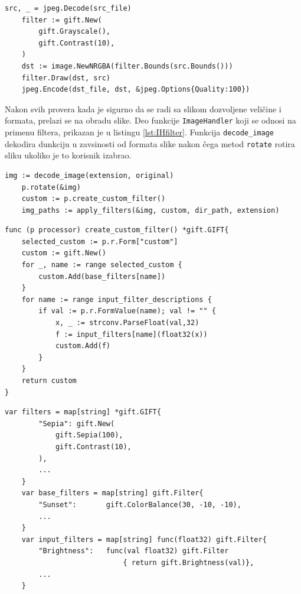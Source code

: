 \documentclass[12pt,oneside]{memoir}
\begin{document}
\begin{center}
\begin{lstlisting}[caption=Definisanje i primena filtera,label={lst:gift},  backgroundcolor=\color{background}]
	src, _ = jpeg.Decode(src_file)
	filter := gift.New(
		gift.Grayscale(),
		gift.Contrast(10),
	)
	dst := image.NewNRGBA(filter.Bounds(src.Bounds()))
	filter.Draw(dst, src)
	jpeg.Encode(dst_file, dst, &jpeg.Options{Quality:100})
\end{lstlisting}
\end{center}

Nakon svih provera kada je sigurno da se radi sa slikom dozvoljene veličine i formata, prelazi se na obradu slike. Deo funkcije  \texttt{ImageHandler} koji se odnosi na primenu filtera, prikazan je u listingu \ref{lst:IHfilter}. Funkcija  \texttt{decode\_image} dekodira dunkciju u zavsinosti od formata slike nakon čega metod  \texttt{rotate} rotira sliku ukoliko je to korisnik izabrao. 

\begin{center}
\begin{lstlisting}[caption=Primena filtera u funkciji ImageHandler,label={lst:IHfilter},  backgroundcolor=\color{background}]
	img := decode_image(extension, original)
	p.rotate(&img)
	custom := p.create_custom_filter()
	img_paths := apply_filters(&img, custom, dir_path, extension)
\end{lstlisting}
\end{center}

\begin{center}
\begin{lstlisting}[caption=Funkcija za kreiranje zadatog filtera,label={lst:custom}, backgroundcolor=\color{background},belowskip=-0.8 \baselineskip]
func (p processor) create_custom_filter() *gift.GIFT{
	selected_custom := p.r.Form["custom"]
	custom := gift.New()
	for _, name := range selected_custom {
		custom.Add(base_filters[name])
	}
	for name := range input_filter_descriptions {
		if val := p.r.FormValue(name); val != "" {
			x, _ := strconv.ParseFloat(val,32)
			f := input_filters[name](float32(x))
			custom.Add(f)
		}
	}
	return custom
}
\end{lstlisting}
\end{center}

\begin{center}
\begin{lstlisting}[caption=Mape koje se koriste za definisanje različitih vrsta filtera,label={lst:maps},  backgroundcolor=\color{background}]
	var filters = map[string] *gift.GIFT{
		"Sepia": gift.New(
			gift.Sepia(100),
			gift.Contrast(10),
		),
		...
	}
	var base_filters = map[string] gift.Filter{
		"Sunset":      	gift.ColorBalance(30, -10, -10),
		...
	}
	var input_filters = map[string] func(float32) gift.Filter{
		"Brightness":	func(val float32) gift.Filter 
							{ return gift.Brightness(val)},
		...
	}
\end{lstlisting}
\end{center}
\end{document}
